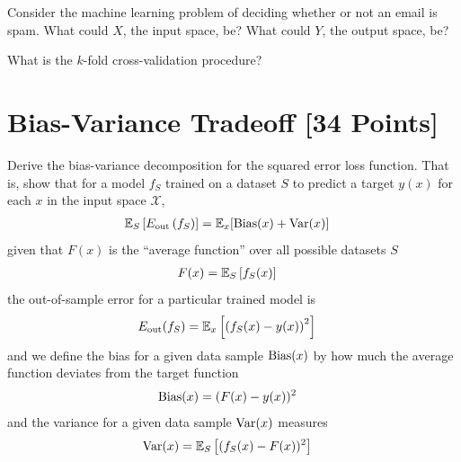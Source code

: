 \begin{problem}[2]
Consider the machine learning problem of deciding whether or not an email is spam.
What could $X$, the input space, be? What could $Y$, the output space, be?
\end{problem}
\begin{solution}

\end{solution}

\begin{problem}[2]
What is the $k$-fold cross-validation procedure?
\end{problem}
\begin{solution}

\end{solution}




\newpage
\section{Bias-Variance Tradeoff [34 Points]}

\begin{problem}[5]
Derive the bias-variance decomposition for the squared error loss function.
That is, show that for a model $f_S$ trained on a dataset $S$ to predict a target $y(x)$ for each $x$ in the input space $\mathcal{X}$,
\begin{align}
	\mathbb{E}_S \left[E_\text{out}\left(f_S\right)\right] & = \mathbb{E}_x[\operatorname{Bias}(x) + \operatorname{Var}(x)]
\end{align}
given that $F(x)$ is the ``average function'' over all possible datasets $S$
\begin{align}
	F(x) & = \mathbb{E}_S\left[f_S(x) \right]
\end{align}
the out-of-sample error for a particular trained model is
\begin{align}
	E_\text{out}(f_S) & = \mathbb{E}_x\left[\left(f_S(x) - y(x)\right)^2\right]
\end{align}
and we define the bias for a given data sample $\operatorname{Bias}(x)$ by how much the average function deviates from the target function
\begin{align}
	\operatorname{Bias}(x) & = (F(x) - y(x))^2
\end{align}
and the variance for a given data sample $\operatorname{Var}(x)$ measures
\begin{align}
	\operatorname{Var}(x) & = \mathbb{E}_S\left[(f_S(x) - F(x))^2\right]
\end{align}
\end{problem}

